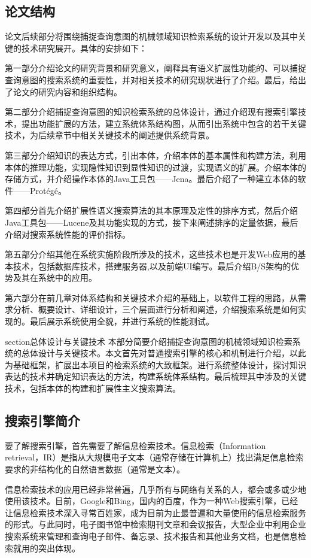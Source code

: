 \documentclass[12pt,a4paper]{article}
\begin{document}
	\subsection{论文结构}
	论文后续部分将围绕捕捉查询意图的机械领域知识检索系统的设计开发以及其中关键的技术研究展开。具体的安排如下：

	第一部分介绍论文的研究背景和研究意义，阐释具有语义扩展性功能的、可以捕捉查询意图的搜索系统的重要性，并对相关技术的研究现状进行了介绍。最后，给出了论文的研究内容和组织结构。

	第二部分介绍捕捉查询意图的知识检索系统的总体设计，通过介绍现有搜索引擎技术，提出功能扩展的方法，建立系统体系结构图，从而引出系统中包含的若干关键技术，为后续章节中相关关键技术的阐述提供系统背景。

	第三部分介绍知识的表达方式，引出本体，介绍本体的基本属性和构建方法，利用本体的推理功能，实现隐性知识到显性知识的过渡，实现语义的扩展。介绍本体的存储方式，并介绍操作本体的Java工具包——Jena。最后介绍了一种建立本体的软件——Prot{\'e}g{\'e}。

	第四部分首先介绍扩展性语义搜索算法的其本原理及定性的排序方式，然后介绍Java工具包——Lucene及其功能实现的方式，接下来阐述排序的定量依据，最后介绍对搜索系统性能的评价指标。

	第五部分介绍其他在系统实施阶段所涉及的技术，这些技术也是开发Web应用的基本技术，包括数据库技术，搭建服务器,以及前端UI编写。最后介绍B/S架构的优势及其在系统中的应用。

	第六部分在前几章对体系结构和关键技术介绍的基础上，以软件工程的思路，从需求分析、概要设计、详细设计，三个层面进行分析和阐述，介绍搜索系统是如何实现的。最后展示系统使用全貌，并进行系统的性能测试。
	
section{总体设计与关键技术}
	本部分简要介绍捕捉查询意图的机械领域知识检索系统的总体设计与关键技术。本文首先对普通搜索引擎的核心和机制进行介绍，以此为基础框架，扩展出本项目的检索系统的大致框架。进行系统整体设计，探讨知识表达的技术并确定知识表达的方法，构建系统体系结构。最后梳理其中涉及的关键技术，包括本体的构建和扩展性主义搜索算法。
	\subsection{搜索引擎简介}
	要了解搜索引擎，首先需要了解信息检索技术。信息检索（Information retrieval，IR）是指从大规模电子文本（通常存储在计算机上）找出满足信息检索要求的非结构化的自然语言数据（通常是文本）。\cite{23}
	
	信息检索技术的应用已经非常普遍，几乎所有与网络有关系的人，都会或多或少地使用该技术。目前，Google和Bing，国内的百度，作为一种Web搜索引擎，已经让信息检索技术深入寻常百姓家，成为目前为止最普遍和大量使用的信息检索服务的形式。与此同时，电子图书馆中检索期刊文章和会议报告，大型企业中利用企业搜索系统来管理和查询电子邮件、备忘录、技术报告和其他业务文档，也是信息检索就用的突出体现。
	
\end{document}
